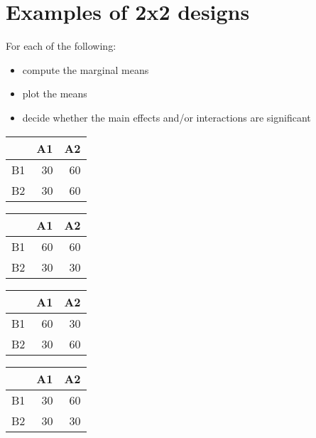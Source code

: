 \documentclass[11pt]{article}
\begin{document}
\section*{Examples of 2x2 designs}
\label{sec-3}

For each of the following:
\begin{itemize}
\item compute the marginal means
\item plot the means
\item decide whether the main effects and/or interactions are significant
\end{itemize}

\begin{center}
\begin{tabular}{lrr}
 & A1 & A2\\
\hline
B1 & 30 & 60\\
B2 & 30 & 60\\
\end{tabular}
\end{center}

\begin{center}
\begin{tabular}{lrr}
 & A1 & A2\\
\hline
B1 & 60 & 60\\
B2 & 30 & 30\\
\end{tabular}
\end{center}

\begin{center}
\begin{tabular}{lrr}
 & A1 & A2\\
\hline
B1 & 60 & 30\\
B2 & 30 & 60\\
\end{tabular}
\end{center}

\begin{center}
\begin{tabular}{lrr}
 & A1 & A2\\
\hline
B1 & 30 & 60\\
B2 & 30 & 30\\
\end{tabular}
\end{center}
\end{document}
